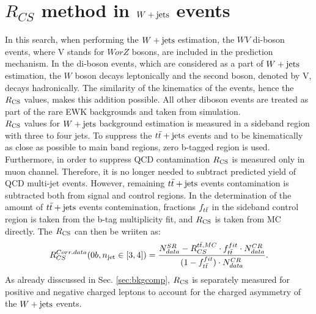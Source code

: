 \section{$R_{CS}$ method in $W+\textrm{jets}$ events}
\label{sec:RcsW}
In this search, when performing the $W+\textrm{jets}$ estimation, the $WV$ di-boson events, where V stands for $W or Z$ bosons, are included in the prediction mechanism. In the di-boson events, which are considered as a part of $W+\textrm{jets}$ estimation, the $W$ boson decays leptonically and the second boson, denoted by V, decays hadronically. The similarity of the kinematics of the events, hence the $R_{\rm CS}$ values, makes this addition possible. All other diboson events are treated as part of the rare EWK backgrounds and taken from simulation.\\
$R_{\rm CS}$ values for $W+\textrm{jets}$ background estimation is measured in a sideband region with three to four jets. To suppress the $t\bar{t}+\textrm{jets}$ events and to be kinematically as close as possible to main band regions, zero b-tagged region is used. 
Furthermore, in order to suppress QCD contamination $R_{\rm CS}$ is measured only in muon channel. Therefore, it is no longer needed to subtract predicted yield of QCD multi-jet events. However, remaining $t\bar{t}+\textrm{jets}$ events contamination is subtracted both from signal and control regions. In the determination of the amount of $t\bar{t}+\textrm{jets}$ events contemination, fractions  $f_{t\bar{t}}$ in the sideband control region is taken from the b-tag multiplicity fit, and $R_{\rm CS}$ is taken from MC directly.
The $R_{\rm CS}$ can then be wriiten as:
\begin{equation}
\label{RCSw}
{R^{Corr. data}_{CS}(0b,\ensuremath{n_{\rm jet}}\in [3,4])} = \frac{N^{SR}_{data}-R^{t\bar{t}, MC}_{CS}\cdot f^{fit}_{t\bar{t}}\cdot N^{CR}_{data}}{(1-f^{fit}_{t\bar{t}})\cdot N^{CR}_{data}}.
\end{equation}
As already disscussed in Sec. \ref{sec:bkgcomp}, $R_{\rm CS}$ is separately measured for positive and negative charged leptons to account for the charged asymmetry of the $W+\textrm{jets}$ events. 

